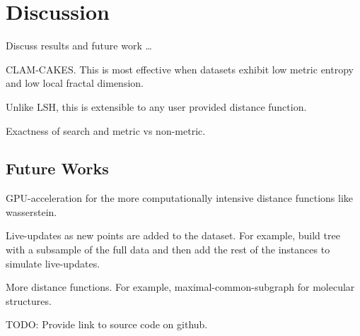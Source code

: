 \section{Discussion}
\label{sec:discussion}

Discuss results and future work \dots

CLAM-CAKES.
This is most effective when datasets exhibit low metric entropy and low local fractal dimension.

Unlike LSH, this is extensible to any user provided distance function.

Exactness of search and metric vs non-metric.

\subsection{Future Works}
\label{subsec:results:future-works}

GPU-acceleration for the more computationally intensive distance functions like wasserstein.

Live-updates as new points are added to the dataset.
For example, build tree with a subsample of the full data and then add the rest of the instances to simulate live-updates.

More distance functions. For example, maximal-common-subgraph for molecular structures.

TODO: Provide link to source code on github.
